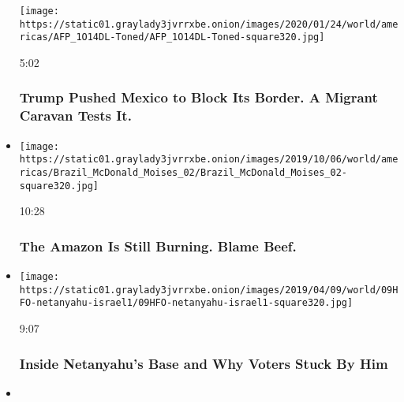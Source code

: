 \begin{itemize}
  \texttt{[image: https://static01.graylady3jvrrxbe.onion/images/2020/01/24/world/americas/AFP\_1O14DL-Toned/AFP\_1O14DL-Toned-square320.jpg]}

  5:02

  \hypertarget{trump-pushed-mexico-to-block-its-border-a-migrant-caravan-tests-it}{%
  \subsubsection{Trump Pushed Mexico to Block Its Border. A Migrant
  Caravan Tests
  It.}\label{trump-pushed-mexico-to-block-its-border-a-migrant-caravan-tests-it}}
\item
  \href{https://www.nytimes3xbfgragh.onion/video/world/americas/100000006721982/amazon-rainforest-fires-burning.html?action=click\&module=video-series-bar\&region=header\&pgtype=Article\&playlistId=video/on-the-ground}{}

  \texttt{[image: https://static01.graylady3jvrrxbe.onion/images/2019/10/06/world/americas/Brazil\_McDonald\_Moises\_02/Brazil\_McDonald\_Moises\_02-square320.jpg]}

  10:28

  \hypertarget{the-amazon-is-still-burning-blame-beef}{%
  \subsubsection{The Amazon Is Still Burning. Blame
  Beef.}\label{the-amazon-is-still-burning-blame-beef}}
\item
  \href{https://www.nytimes3xbfgragh.onion/video/world/middleeast/100000006431686/israel-elections-netanyahu.html?action=click\&module=video-series-bar\&region=header\&pgtype=Article\&playlistId=video/on-the-ground}{}

  \texttt{[image: https://static01.graylady3jvrrxbe.onion/images/2019/04/09/world/09HFO-netanyahu-israel1/09HFO-netanyahu-israel1-square320.jpg]}

  9:07

  \hypertarget{inside-netanyahus-base-and-why-voters-stuck-by-him}{%
  \subsubsection{Inside Netanyahu's Base and Why Voters Stuck By
  Him}\label{inside-netanyahus-base-and-why-voters-stuck-by-him}}
\item
  \href{https://www.nytimes3xbfgragh.onion/video/world/asia/100000006581732/hong-kong-protesters.html?action=click\&module=video-series-bar\&region=header\&pgtype=Article\&playlistId=video/on-the-ground}{}


\end{itemize}
